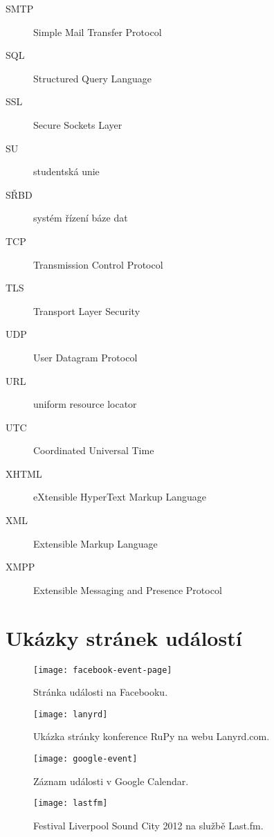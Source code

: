 \documentclass[12pt,oneside,final]{fithesis2}
\begin{document}
\begin{description}
    \item[SMTP] Simple Mail Transfer Protocol
    \item[SQL] Structured Query Language
    \item[SSL] Secure Sockets Layer
    \item[SU] studentská unie
    \item[SŘBD] systém řízení báze dat
    \item[TCP] Transmission Control Protocol
    \item[TLS] Transport Layer Security
    \item[UDP] User Datagram Protocol
    \item[URL] uniform resource locator
    \item[UTC] Coordinated Universal Time
    \item[XHTML] eXtensible HyperText Markup Language
    \item[XML] Extensible Markup Language
    \item[XMPP] Extensible Messaging and Presence Protocol
\end{description}



\chapter{Ukázky stránek událostí}\label{eventPagePictures}

\begin{figure}[h]
    \centering
    \texttt{[image: facebook-event-page]}
    \caption{Stránka události na Facebooku.}
\end{figure}

\begin{figure}[h]
    \centering
    \texttt{[image: lanyrd]}
    \caption{Ukázka stránky konference RuPy na webu Lanyrd.com.}
\end{figure}

\begin{figure}[h]
    \texttt{[image: google-event]}
    \caption{Záznam události v Google Calendar.}
\end{figure}

\begin{figure}[h]
    \texttt{[image: lastfm]}
    \caption{Festival Liverpool Sound City 2012 na službě Last.fm.}
\end{figure}
\end{document}
